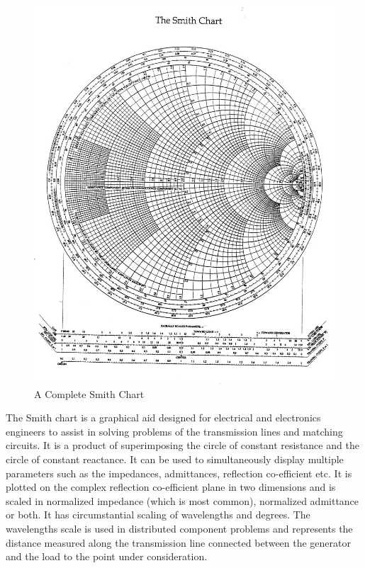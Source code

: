 \begin{figure}[h]
\centering
\includegraphics[width=0.7\linewidth]{"./graphics/smith_chart (2)"}
\caption{A Complete Smith Chart}
\label{fig:smithchart-2}
\end{figure}

The Smith chart is a graphical aid designed for electrical and electronics engineers to assist in solving problems of the transmission lines and matching circuits. It is a product of superimposing the circle of constant resistance and the circle of constant reactance. It can be used to simultaneously display multiple parameters such as the impedances, admittances, reflection co-efficient etc.
It is plotted on the complex reflection co-efficient plane in two dimensions and is scaled in normalized impedance (which is most common), normalized admittance or both. It has circumstantial scaling of wavelengths and degrees. The wavelengths scale is used in distributed component problems and represents the distance measured along the transmission line connected between the generator and the load to the point under consideration.

